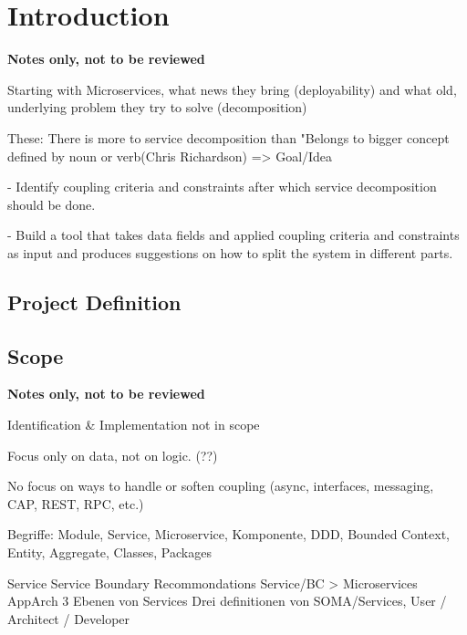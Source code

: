 \chapter{Introduction}

\textbf{Notes only, not to be reviewed}

Starting with Microservices, what news they bring (deployability) and what old, underlying problem they try to solve (decomposition)

These: There is more to service decomposition than "Belongs to bigger concept defined by noun or verb(Chris Richardson)
=> Goal/Idea

- Identify coupling criteria and constraints after which service 
decomposition should be done. 

- Build a tool that takes data fields and applied coupling criteria and constraints as input and produces suggestions on how to split the system in different parts. 

\section{Project Definition}


\section{Scope}

\textbf{Notes only, not to be reviewed}

Identification \& Implementation not in scope

Focus only on data, not on logic. (??)

No focus on ways to handle or soften coupling (async, interfaces, messaging, CAP, REST, RPC, etc.)

Begriffe: Module, Service, Microservice, Komponente, DDD, Bounded Context, Entity, Aggregate, Classes, Packages

Service
Service Boundary Recommondations
Service/BC > Microservices 
AppArch 3 Ebenen von Services
Drei definitionen von SOMA/Services, User / Architect / Developer
